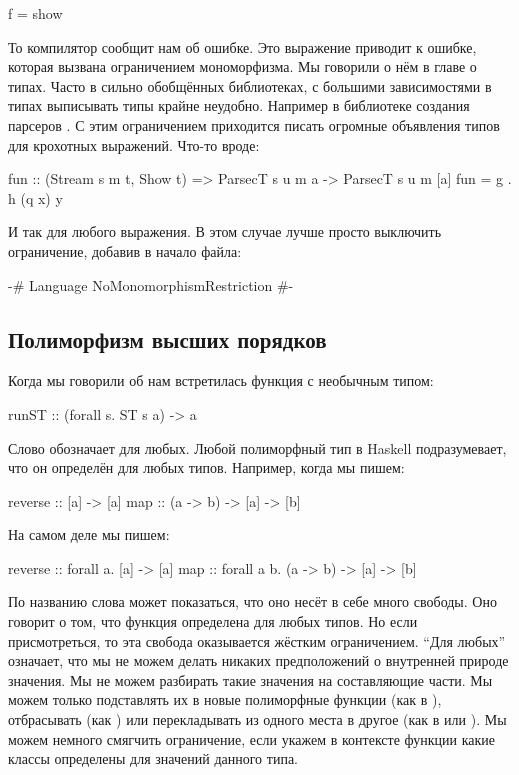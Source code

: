 \begin{code}
f = show
\end{code}

То компилятор сообщит нам об ошибке. Это выражение приводит к ошибке,
которая вызвана ограничением мономорфизма. Мы говорили о нём в главе о
типах. Часто в сильно обобщённых библиотеках, с большими зависимостями в
типах выписывать типы крайне неудобно. Например в библиотеке создания
парсеров . С этим ограничением приходится писать огромные
объявления типов для крохотных выражений. Что-то вроде:


\begin{code}
fun :: (Stream s m t, Show t) => ParsecT s u m a -> ParsecT s u m [a]
fun = g . h (q x) y
\end{code}

И так для любого выражения. В этом случае лучше просто выключить
ограничение, добавив в начало файла:


\begin{code}
{-# Language NoMonomorphismRestriction #-}
\end{code}

\subsection{Полиморфизм высших порядков}

Когда мы говорили об  нам встретилась функция с необычным типом:


\begin{code}
runST :: (forall s. ST s a) -> a
\end{code}

Слово  обозначает для любых. Любой полиморфный тип в Haskell
подразумевает, что он определён для любых типов. Например, когда мы
пишем:


\begin{code}
reverse :: [a] -> [a]
map     :: (a -> b) -> [a] -> [b]
\end{code}

\noindent 

На самом деле мы пишем:


\begin{code}
reverse :: forall a. [a] -> [a]
map     :: forall a b. (a -> b) -> [a] -> [b]
\end{code}

По названию слова  может показаться, что оно несёт в себе
много свободы. Оно говорит о том, что функция определена для любых
типов. Но если присмотреться, то эта свобода оказывается жёстким
ограничением. ``Для любых'' означает, что мы не можем делать никаких
предположений о внутренней природе значения. Мы не можем разбирать такие
значения на составляющие части. Мы можем только подставлять их в новые
полиморфные функции (как в ), отбрасывать (как ) или
перекладывать из одного места в другое (как в  или
). Мы можем немного смягчить ограничение, если укажем в
контексте функции какие классы определены для значений данного типа.

